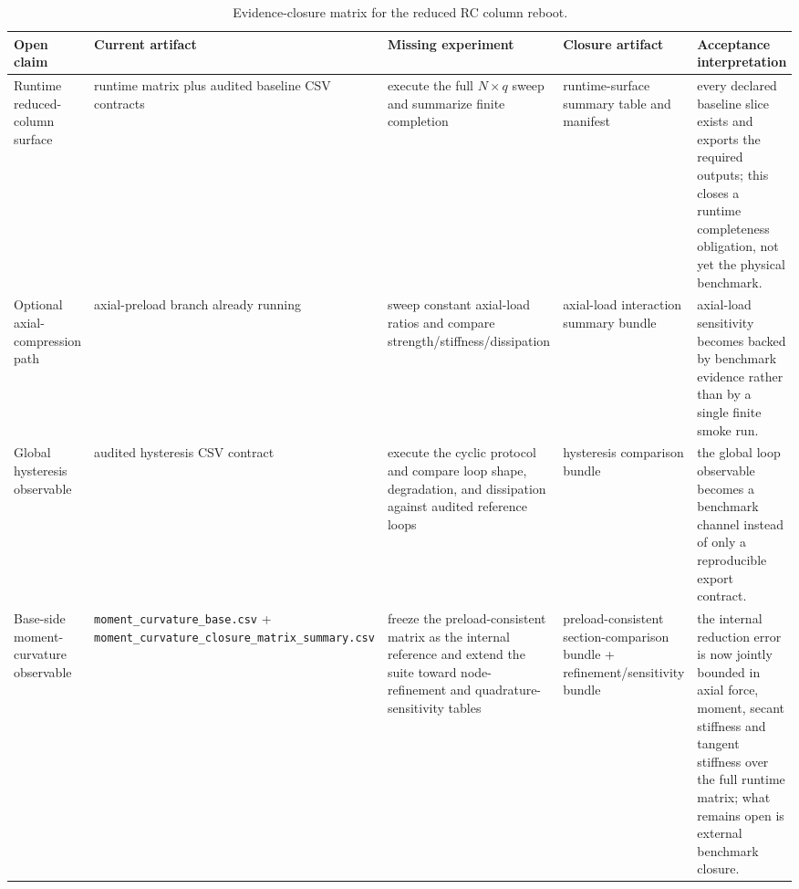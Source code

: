 \begin{table}[htbp]
  \centering
  \caption{Evidence-closure matrix for the reduced RC column reboot.}
  \label{tab:reduced-rc-column-evidence-closure}
  \scriptsize
  \setlength{\tabcolsep}{3pt}
  \begin{tabularx}{\textwidth}{@{}p{}p{}p{}p{}X@{}}
    \toprule
    \textbf{Open claim} & \textbf{Current artifact} & \textbf{Missing experiment}
    & \textbf{Closure artifact} & \textbf{Acceptance interpretation} \\
    \midrule
    Runtime reduced-column surface
    & runtime matrix plus audited baseline CSV contracts
    & execute the full \(N \times q\) sweep and summarize finite completion
    & runtime-surface summary table and manifest
    & every declared baseline slice exists and exports the required outputs;
      this closes a runtime completeness obligation, not yet the physical
      benchmark. \\[0.4mm]

    Optional axial-compression path
    & axial-preload branch already running
    & sweep constant axial-load ratios and compare strength/stiffness/dissipation
    & axial-load interaction summary bundle
    & axial-load sensitivity becomes backed by benchmark evidence rather than
      by a single finite smoke run. \\[0.4mm]

    Global hysteresis observable
    & audited hysteresis CSV contract
    & execute the cyclic protocol and compare loop shape, degradation, and
      dissipation against audited reference loops
    & hysteresis comparison bundle
    & the global loop observable becomes a benchmark channel instead of only a
      reproducible export contract. \\[0.4mm]

    Base-side moment-curvature observable
    & \texttt{moment\_curvature\_base.csv} +
      \texttt{moment\_curvature\_closure\_matrix\_summary.csv}
    & freeze the preload-consistent matrix as the internal reference and
      extend the suite toward node-refinement and quadrature-sensitivity
      tables
    & preload-consistent section-comparison bundle +
      refinement/sensitivity bundle
    & the internal reduction error is now jointly bounded in axial force,
      moment, secant stiffness and tangent stiffness over the full runtime
      matrix; what remains open is external benchmark closure. \\[0.4mm]


\end{tabularx}
\end{table}
